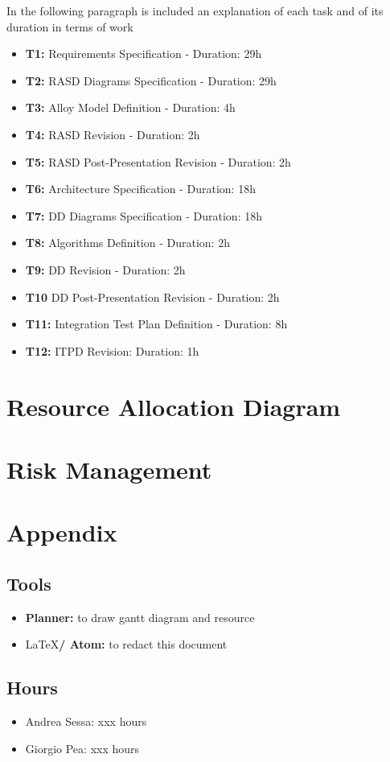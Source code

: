 \documentclass[11pt,titlepage]{article} %
\begin{document}
In the following paragraph is included an explanation of each task and of its duration in terms of work
\begin{itemize}
 \item \textbf{T1:} Requirements Specification - Duration: 29h
 \item \textbf{T2:} RASD Diagrams Specification - Duration: 29h
 \item \textbf{T3:} Alloy Model Definition - Duration: 4h
 \item \textbf{T4:} RASD Revision - Duration: 2h
 \item \textbf{T5:} RASD Post-Presentation Revision - Duration: 2h
 \item \textbf{T6:} Architecture Specification - Duration: 18h
 \item \textbf{T7:} DD Diagrams Specification - Duration: 18h
 \item \textbf{T8:} Algorithms Definition - Duration: 2h
 \item \textbf{T9:} DD Revision - Duration: 2h
 \item \textbf{T10} DD Post-Presentation Revision - Duration: 2h
 \item \textbf{T11:} Integration Test Plan Definition - Duration: 8h
 \item \textbf{T12:} ITPD Revision: Duration: 1h
\end{itemize}

\newpage
\section{Resource Allocation Diagram}

\section{Risk Management}

\section{Appendix}
  	\subsection{Tools}
		\begin{itemize}
			\item \textbf{Planner:} to draw gantt diagram and resource
			\item \LaTeX \textbf{/ Atom:} to redact this document
		\end{itemize}

	\subsection{Hours}
		\begin{itemize}
			\item Andrea Sessa: xxx hours
			\item Giorgio Pea: xxx hours
		\end{itemize}
\end{document}
